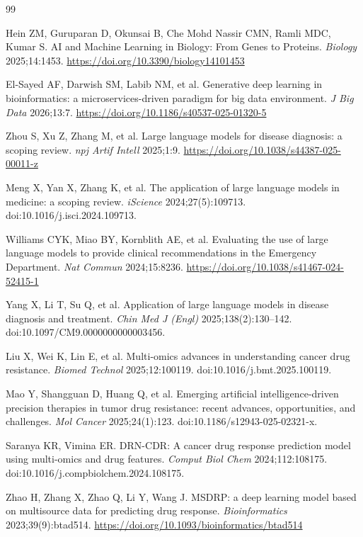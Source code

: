 \documentclass[11pt,letterpaper]{article}
\begin{document}
\begin{thebibliography}{99}

Hein ZM, Guruparan D, Okunsai B, Che Mohd Nassir CMN, Ramli MDC, Kumar S.
AI and Machine Learning in Biology: From Genes to Proteins.
\textit{Biology} 2025;14:1453.
\url{https://doi.org/10.3390/biology14101453}

El-Sayed AF, Darwish SM, Labib NM, et al.
Generative deep learning in bioinformatics: a microservices-driven paradigm for big data environment.
\textit{J Big Data} 2026;13:7.
\url{https://doi.org/10.1186/s40537-025-01320-5}

Zhou S, Xu Z, Zhang M, et al.
Large language models for disease diagnosis: a scoping review.
\textit{npj Artif Intell} 2025;1:9.
\url{https://doi.org/10.1038/s44387-025-00011-z}

Meng X, Yan X, Zhang K, et al.
The application of large language models in medicine: a scoping review.
\textit{iScience} 2024;27(5):109713.
doi:10.1016/j.isci.2024.109713.

Williams CYK, Miao BY, Kornblith AE, et al.
Evaluating the use of large language models to provide clinical recommendations in the Emergency Department.
\textit{Nat Commun} 2024;15:8236.
\url{https://doi.org/10.1038/s41467-024-52415-1}

Yang X, Li T, Su Q, et al.
Application of large language models in disease diagnosis and treatment.
\textit{Chin Med J (Engl)} 2025;138(2):130--142.
doi:10.1097/CM9.0000000000003456.

Liu X, Wei K, Lin E, et al.
Multi-omics advances in understanding cancer drug resistance.
\textit{Biomed Technol} 2025;12:100119.
doi:10.1016/j.bmt.2025.100119.

Mao Y, Shangguan D, Huang Q, et al.
Emerging artificial intelligence-driven precision therapies in tumor drug resistance: recent advances, opportunities, and challenges.
\textit{Mol Cancer} 2025;24(1):123.
doi:10.1186/s12943-025-02321-x.

Saranya KR, Vimina ER.
DRN-CDR: A cancer drug response prediction model using multi-omics and drug features.
\textit{Comput Biol Chem} 2024;112:108175.
doi:10.1016/j.compbiolchem.2024.108175.

Zhao H, Zhang X, Zhao Q, Li Y, Wang J.
MSDRP: a deep learning model based on multisource data for predicting drug response.
\textit{Bioinformatics} 2023;39(9):btad514.
\url{https://doi.org/10.1093/bioinformatics/btad514}


\end{thebibliography}
\end{document}
